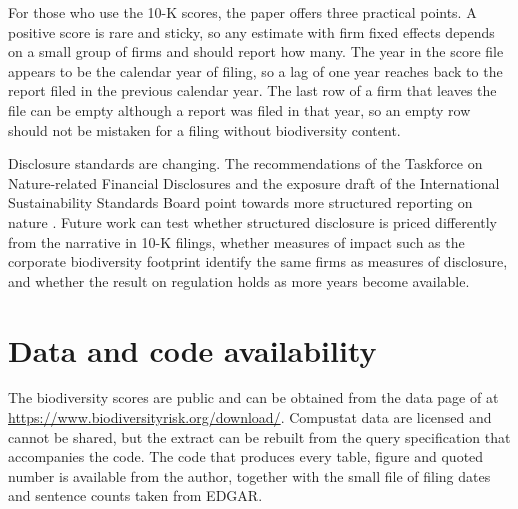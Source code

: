 \documentclass[12pt,a4paper]{article}
\begin{document}
For those who use the 10-K scores, the paper offers three practical points. A positive score is rare and sticky, so any estimate with firm fixed effects depends on a small group of firms and should report how many. The year in the score file appears to be the calendar year of filing, so a lag of one year reaches back to the report filed in the previous calendar year. The last row of a firm that leaves the file can be empty although a report was filed in that year, so an empty row should not be mistaken for a filing without biodiversity content.

Disclosure standards are changing. The recommendations of the Taskforce on Nature-related Financial Disclosures and the exposure draft of the International Sustainability Standards Board point towards more structured reporting on nature \citep{tnfd2023,issb2026}. Future work can test whether structured disclosure is priced differently from the narrative in 10-K filings, whether measures of impact such as the corporate biodiversity footprint identify the same firms as measures of disclosure, and whether the result on regulation holds as more years become available.

\section*{Data and code availability}

The biodiversity scores are public and can be obtained from the data page of \citet{giglio2026} at \url{https://www.biodiversityrisk.org/download/}. Compustat data are licensed and cannot be shared, but the extract can be rebuilt from the query specification that accompanies the code. The code that produces every table, figure and quoted number is available from the author, together with the small file of filing dates and sentence counts taken from EDGAR.
\end{document}
